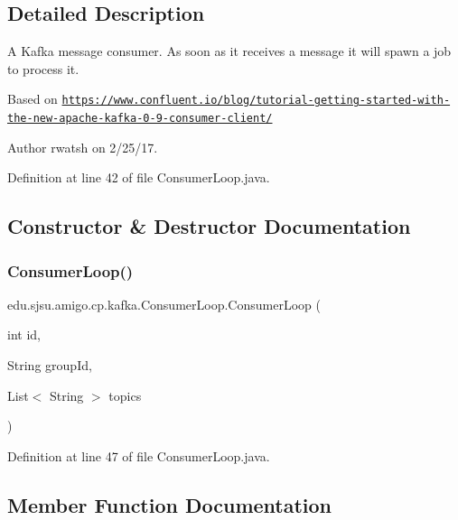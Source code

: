\subsection{Detailed Description}
A Kafka message consumer. As soon as it receives a message it will spawn a job to process it.

Based on \href{https://www.confluent.io/blog/tutorial-getting-started-with-the-new-apache-kafka-0-9-consumer-client/}{\tt https\+://www.\+confluent.\+io/blog/tutorial-\/getting-\/started-\/with-\/the-\/new-\/apache-\/kafka-\/0-\/9-\/consumer-\/client/}

\begin{DoxyAuthor}{Author}
rwatsh on 2/25/17. 
\end{DoxyAuthor}


Definition at line 42 of file Consumer\+Loop.\+java.



\subsection{Constructor \& Destructor Documentation}
\mbox{\label{classedu_1_1sjsu_1_1amigo_1_1cp_1_1kafka_1_1_consumer_loop_aaa2ca0a5aab4e8df4110d9bd3ccb771a}} 
\subsubsection{\texorpdfstring{Consumer\+Loop()}{ConsumerLoop()}}
{\footnotesize\ttfamily edu.\+sjsu.\+amigo.\+cp.\+kafka.\+Consumer\+Loop.\+Consumer\+Loop (\begin{DoxyParamCaption}\item[{int}]{id,  }\item[{String}]{group\+Id,  }\item[{List$<$ String $>$}]{topics }\end{DoxyParamCaption})}



Definition at line 47 of file Consumer\+Loop.\+java.



\subsection{Member Function Documentation}
\mbox{\label{classedu_1_1sjsu_1_1amigo_1_1cp_1_1kafka_1_1_consumer_loop_a8f37a453074be900b2b72b24162ebec1}} 
